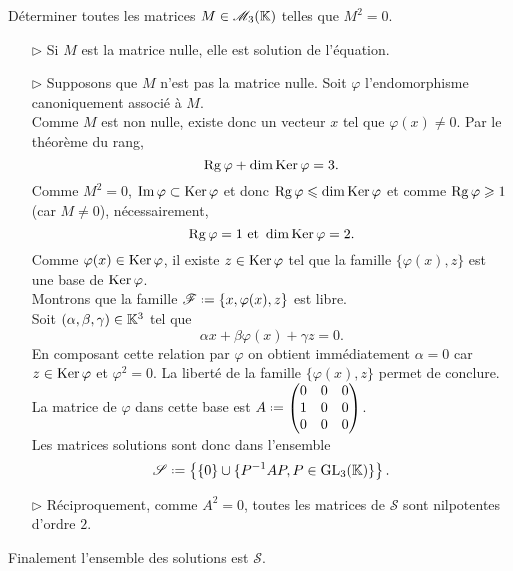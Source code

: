 \begin{exercice}
    Déterminer toutes les matrices $M \in \mathscr{M}_3(\mathbb{K})$ telles que $M^2=0$.
\end{exercice}

\begin{solution}
    \begin{itemize}
        \item[$\rhd$] Si $M$ est la matrice nulle, elle est solution de l'équation.
        \item[$\rhd$] Supposons que $M$ n'est pas la matrice nulle. Soit $\varphi$ l'endomorphisme canoniquement associé à $M$. \\
        Comme $M$ est non nulle, existe donc un vecteur $x$ tel que $\varphi(x) \not= 0$. Par le théorème du rang, 
        $$\mathrm{Rg}\, \varphi + \dim \mathrm{Ker}\, \varphi = 3.$$ 
        Comme $M^2 = 0$, $\Im \varphi \subset \mathrm{Ker}\, \varphi$ et donc $\mathrm{Rg}\, \varphi \leqslant \dim \mathrm{Ker}\, \varphi$ et comme $\mathrm{Rg}\, \varphi \geqslant 1$ (car $M \not=0$), nécessairement, 
        $$\mathrm{Rg}\, \varphi = 1 \text{ et } \dim \mathrm{Ker}\, \varphi = 2.$$
        Comme $\varphi(x) \in \mathrm{Ker}\, \varphi$, il existe $z \in \mathrm{Ker}\, \varphi$ tel que la famille $\{ \varphi(x), z \}$ est une base de $\mathrm{Ker}\, \varphi$. \\
        Montrons que la famille $\mathscr{F} \defeq \{x, \varphi(x), z \}$ est libre. \\
        Soit $(\alpha, \beta, \gamma) \in \mathbb{K}^3$ tel que 
        $$\alpha x + \beta \varphi(x) + \gamma z = 0.$$
        En composant cette relation par $\varphi$ on obtient immédiatement $\alpha = 0$ car $z \in \mathrm{Ker}\, \varphi$ et $\varphi^2 = 0$. La liberté de la famille $\{ \varphi(x), z \}$ permet de conclure. \\
        La matrice de $\varphi$ dans cette base est 
        $A \defeq
        \begin{pmatrix}
        0 & 0 & 0 \\
        1 & 0 & 0 \\ 
        0 & 0 & 0
        \end{pmatrix}
        $. \\
        Les matrices solutions sont donc dans l'ensemble
        $$\mathscr{S} \defeq \left \{ \{0\} \cup \{\Inv{P} A P, P \in \Gl_3(\K) \} \right \}.$$
        \item[$\rhd$] Réciproquement, comme $A^2 = 0$, toutes les matrices de $\mathscr{S}$ sont nilpotentes d'ordre $2$. \\
    \end{itemize}
    Finalement l'ensemble des solutions est $\mathscr{S}$.
\end{solution}
